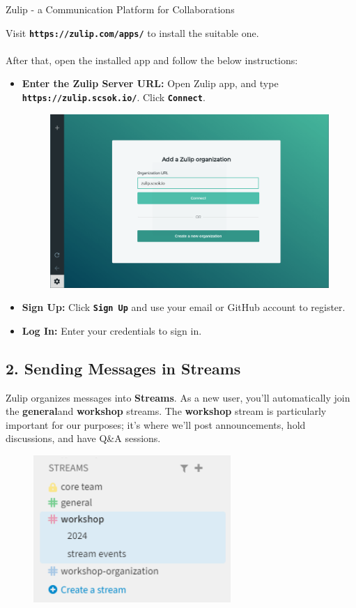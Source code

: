 \begin{coverpage}{Zulip - a Communication Platform for Collaborations}
{{\centering \noindent Visit \textbf{\texttt{https://zulip.com/apps/}} to install the suitable one.}
\\
\\
After that, open the installed app and follow the below instructions:
\begin{itemize}[leftmargin=0.5cm, rightmargin=0.5cm]
\item \textbf{Enter the Zulip Server URL:} Open Zulip app, and type \\ \textbf{\texttt{https://zulip.scsok.io/}}. Click \textbf{\texttt{Connect}}.
\begin{figure}[h]
\includegraphics[width=\textwidth]{images/zulip-new-url.png}
\end{figure}
\item \textbf{Sign Up:} Click \textbf{\texttt{Sign Up}} and use your email or GitHub account to register.
\item \textbf{Log In:} Enter your credentials to sign in.
\end{itemize}
\subsection*{2. Sending Messages in Streams}
Zulip organizes messages into \textbf{Streams}. As a new user, you'll automatically join the \textbf{general}and \textbf{workshop} streams. The \textbf{workshop} stream is particularly important for our purposes; it's where we'll post announcements, hold discussions, and have Q\&A sessions.

\begin{figure}[h]
\includegraphics[width=7.5cm]{images/zulip-streams.png}
\centering
\end{figure}

}
\end{coverpage}
